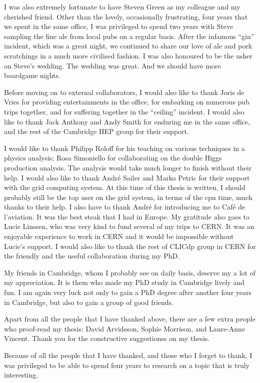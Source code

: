 \begin{acknowledgements}
I was also extremely fortunate to have Steven Green as my colleague and my cherished friend. Other than the lovely, occasionally frustrating, four years that we spent in the same office,   I was privileged to spend two years with Steve sampling the fine ale from local pubs on a regular basis. After the infamous ``gin'' incident, which was a great night, we continued to share our love of ale and pork scratchings in a much more civilised fashion. I was also honoured to be the usher on Steve's wedding. The wedding was great. And we should have more boardgame nights.

Before moving on to external collaborators, I would also like to thank Joris de Vries for providing entertainments in the office, for embarking on numerous pub trips together, and for suffering together in the ``ceiling'' incident. I would also like to thank Jack Anthony and Andy Smith for enduring me in the same office, and the rest of the Cambridge HEP group for their support.

I would like to thank Philipp Roloff for his teaching on various techniques in a physics analysis; Rosa Simoniello for collaborating on the double Higgs production analysis. The analysis would take much longer to finish without their help. I would also like to thank Andr\'{e} Sailer and Marko Petric for their support with the \CLIC grid computing system. At this time of this thesis is written, I should probably still be the top user on the grid system, in terms of the cpu time, much thanks to their help. I also have to thank Andr\'{e} for introducing me to Caf\'{e} de l'aviation. It was the best steak that I had in Europe. My gratitude also goes to Lucie Linssen, who was very kind to fund several of my trips to CERN. It was an enjoyable experience to work in CERN and it would be impossible without Lucie's support. I would also like to thank the rest of CLICdp group in CERN for the friendly and the useful collaboration during my PhD.

My friends in Cambridge, whom I probably see on daily basis, deserve my a lot of my appreciation. It is them who made my PhD study in Cambridge lively and fun. I am again very luck not only to gain a PhD degree after another four years in Cambridge, but also to gain a group of good friends.

Apart from all the people that I have thanked above, there are a few extra people who proof-read my thesis: David Arvidsson, Sophie Morrison, and Laure-Anne Vincent. Thank you for the constructive suggestionss on my thesis.

Because of all the people that I have thanked, and those who I forget to thank, I was privileged to be able to spend four years to research on a topic that is truly interesting.


\end{acknowledgements}


